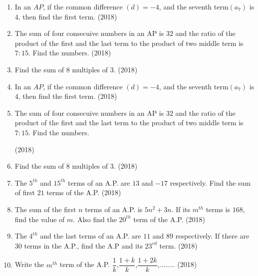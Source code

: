 \begin{enumerate}[label=\thesubsection.\arabic*,ref=\thesubsection.\theenumi,itemsep=1pt]
			 \item In an $AP$, if the common difference $(d) = -4$, and the seventh term$(a_7)$ is $4$, then find the first term.		
			\hfill (2018) \item The sum of four consecuive numbers in an AP is $32$ and the ratio of the product of the first and the last term to the product of two middle term is $7:15$. Find the numbers.
	\hfill (2018) \item Find the sum of $8$ multiples of $3$.
\hfill (2018)

			 \item In an $AP$, if the common difference $(d) = -4$, and the seventh term$(a_7)$ is $4$, then find the first term.		
			\hfill (2018) \item The sum of four consecuive numbers in an AP is $32$ and the ratio of the product of the first and the last term to the product of two middle term is $7:15$. Find the numbers.

	\hfill (2018) \item Find the sum of $8$ multiples of $3$.
\hfill (2018)
 \item The $5^{th}$ and $15^{th}$ terms of an A.P. are $13$ and $-17$ respectively. Find the sum of first $21$ terms of the A.P.
\hfill (2018)

 \item The sum of the first $n$ terms of an A.P. is $5n^{2}+3n$. If its $m^{th}$ terms is $168$, find the value of $m$. Also find the $20^{th}$ term of the A.P.
\hfill (2018) \item The $4^{th}$ and the last terms of an A.P. are $11$ and $89$ respectively. If there are $30$ terms in the A.P., find the A.P and its $23^{rd}$ term.
\hfill (2018) \item Write the $m^{th}$ term of the A.P. $\dfrac{1}{k}$,$\dfrac{1+k}{k}$,$\dfrac{1+2k}{k}$,........
\hfill (2018)
\end{enumerate}

